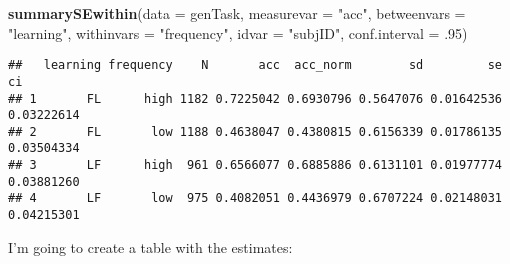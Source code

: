 \documentclass[
]{article}
\newenvironment{Shaded}{\begin{snugshade}}{\end{snugshade}}
\newcommand{\DataTypeTok}[1]{\textcolor[rgb]{0.13,0.29,0.53}{#1}}
\newcommand{\FloatTok}[1]{\textcolor[rgb]{0.00,0.00,0.81}{#1}}
\newcommand{\KeywordTok}[1]{\textcolor[rgb]{0.13,0.29,0.53}{\textbf{#1}}}
\newcommand{\NormalTok}[1]{#1}
\newcommand{\StringTok}[1]{\textcolor[rgb]{0.31,0.60,0.02}{#1}}
\begin{document}
\begin{Shaded}
\begin{Highlighting}[]
\KeywordTok{summarySEwithin}\NormalTok{(}\DataTypeTok{data =}\NormalTok{ genTask, }\DataTypeTok{measurevar =} \StringTok{"acc"}\NormalTok{, }\DataTypeTok{betweenvars =} \StringTok{"learning"}\NormalTok{, }\DataTypeTok{withinvars =} \StringTok{"frequency"}\NormalTok{, }\DataTypeTok{idvar =} \StringTok{"subjID"}\NormalTok{, }\DataTypeTok{conf.interval =} \FloatTok{.95}\NormalTok{)}
\end{Highlighting}
\end{Shaded}

\begin{verbatim}
##   learning frequency    N       acc  acc_norm        sd         se         ci
## 1       FL      high 1182 0.7225042 0.6930796 0.5647076 0.01642536 0.03222614
## 2       FL       low 1188 0.4638047 0.4380815 0.6156339 0.01786135 0.03504334
## 3       LF      high  961 0.6566077 0.6885886 0.6131101 0.01977774 0.03881260
## 4       LF       low  975 0.4082051 0.4436979 0.6707224 0.02148031 0.04215301
\end{verbatim}

I'm going to create a table with the estimates:
\end{document}
